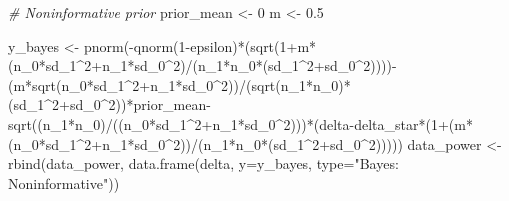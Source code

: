 \documentclass[
]{book}
\newenvironment{Shaded}{\begin{snugshade}}{\end{snugshade}}
\newcommand{\AttributeTok}[1]{\textcolor[rgb]{0.77,0.63,0.00}{#1}}
\newcommand{\CommentTok}[1]{\textcolor[rgb]{0.56,0.35,0.01}{\textit{#1}}}
\newcommand{\DecValTok}[1]{\textcolor[rgb]{0.00,0.00,0.81}{#1}}
\newcommand{\FloatTok}[1]{\textcolor[rgb]{0.00,0.00,0.81}{#1}}
\newcommand{\FunctionTok}[1]{\textcolor[rgb]{0.00,0.00,0.00}{#1}}
\newcommand{\NormalTok}[1]{#1}
\newcommand{\OtherTok}[1]{\textcolor[rgb]{0.56,0.35,0.01}{#1}}
\newcommand{\SpecialCharTok}[1]{\textcolor[rgb]{0.00,0.00,0.00}{#1}}
\newcommand{\StringTok}[1]{\textcolor[rgb]{0.31,0.60,0.02}{#1}}
\begin{document}
\begin{Shaded}
\begin{Highlighting}[]
\CommentTok{\# Noninformative prior}
\NormalTok{prior\_mean }\OtherTok{\textless{}{-}} \DecValTok{0}
\NormalTok{m }\OtherTok{\textless{}{-}} \FloatTok{0.5}

\NormalTok{y\_bayes }\OtherTok{\textless{}{-}} \FunctionTok{pnorm}\NormalTok{(}\SpecialCharTok{{-}}\FunctionTok{qnorm}\NormalTok{(}\DecValTok{1}\SpecialCharTok{{-}}\NormalTok{epsilon)}\SpecialCharTok{*}\NormalTok{(}\FunctionTok{sqrt}\NormalTok{(}\DecValTok{1}\SpecialCharTok{+}\NormalTok{m}\SpecialCharTok{*}\NormalTok{(n\_0}\SpecialCharTok{*}\NormalTok{sd\_1}\SpecialCharTok{\^{}}\DecValTok{2}\SpecialCharTok{+}\NormalTok{n\_1}\SpecialCharTok{*}\NormalTok{sd\_0}\SpecialCharTok{\^{}}\DecValTok{2}\NormalTok{)}\SpecialCharTok{/}\NormalTok{(n\_1}\SpecialCharTok{*}\NormalTok{n\_0}\SpecialCharTok{*}\NormalTok{(sd\_1}\SpecialCharTok{\^{}}\DecValTok{2}\SpecialCharTok{+}\NormalTok{sd\_0}\SpecialCharTok{\^{}}\DecValTok{2}\NormalTok{))))}\SpecialCharTok{{-}}\NormalTok{(m}\SpecialCharTok{*}\FunctionTok{sqrt}\NormalTok{(n\_0}\SpecialCharTok{*}\NormalTok{sd\_1}\SpecialCharTok{\^{}}\DecValTok{2}\SpecialCharTok{+}\NormalTok{n\_1}\SpecialCharTok{*}\NormalTok{sd\_0}\SpecialCharTok{\^{}}\DecValTok{2}\NormalTok{))}\SpecialCharTok{/}\NormalTok{(}\FunctionTok{sqrt}\NormalTok{(n\_1}\SpecialCharTok{*}\NormalTok{n\_0)}\SpecialCharTok{*}\NormalTok{(sd\_1}\SpecialCharTok{\^{}}\DecValTok{2}\SpecialCharTok{+}\NormalTok{sd\_0}\SpecialCharTok{\^{}}\DecValTok{2}\NormalTok{))}\SpecialCharTok{*}\NormalTok{prior\_mean}\SpecialCharTok{{-}}\FunctionTok{sqrt}\NormalTok{((n\_1}\SpecialCharTok{*}\NormalTok{n\_0)}\SpecialCharTok{/}\NormalTok{((n\_0}\SpecialCharTok{*}\NormalTok{sd\_1}\SpecialCharTok{\^{}}\DecValTok{2}\SpecialCharTok{+}\NormalTok{n\_1}\SpecialCharTok{*}\NormalTok{sd\_0}\SpecialCharTok{\^{}}\DecValTok{2}\NormalTok{)))}\SpecialCharTok{*}\NormalTok{(delta}\SpecialCharTok{{-}}\NormalTok{delta\_star}\SpecialCharTok{*}\NormalTok{(}\DecValTok{1}\SpecialCharTok{+}\NormalTok{(m}\SpecialCharTok{*}\NormalTok{(n\_0}\SpecialCharTok{*}\NormalTok{sd\_1}\SpecialCharTok{\^{}}\DecValTok{2}\SpecialCharTok{+}\NormalTok{n\_1}\SpecialCharTok{*}\NormalTok{sd\_0}\SpecialCharTok{\^{}}\DecValTok{2}\NormalTok{))}\SpecialCharTok{/}\NormalTok{(n\_1}\SpecialCharTok{*}\NormalTok{n\_0}\SpecialCharTok{*}\NormalTok{(sd\_1}\SpecialCharTok{\^{}}\DecValTok{2}\SpecialCharTok{+}\NormalTok{sd\_0}\SpecialCharTok{\^{}}\DecValTok{2}\NormalTok{)))))}
\NormalTok{data\_power }\OtherTok{\textless{}{-}} \FunctionTok{rbind}\NormalTok{(data\_power, }\FunctionTok{data.frame}\NormalTok{(delta, }\AttributeTok{y=}\NormalTok{y\_bayes, }\AttributeTok{type=}\StringTok{"Bayes: Noninformative"}\NormalTok{))}


\end{Highlighting}
\end{Shaded}
\end{document}
